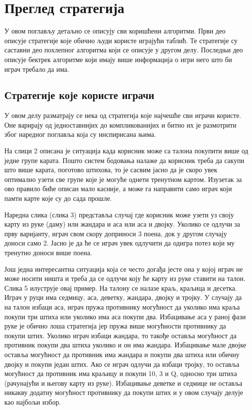 \documentclass[a4paper, 12pt, ngerman]{article}
\let\oldsection\section
\renewcommand\section{\clearpage\oldsection}
\let\oldsubsection\subsection
\renewcommand\subsection{\clearpage\oldsubsection}
\begin{document}
\section{Преглед стратегија}
У овом поглављу детаљно се описују сви коришћени алгоритми. Први део описује стратегије које обично људи користе играјући таблић. Те стратегије су саставни део похлепног алгоритма који се описује у другом делу. Последњи део описује бектрек алгоритме који имају више информација о игри него што би играч требало да има.


\subsection{Стратегије које користе играчи}
У овом делу разматрају се нека од стратегија које најчешће сви играчи користе. Оне варирају од једноставнијих до компликованијих и битно их је размотрити због наредног поглавља која су инспирисана њима.

На слици 2 описана је ситуација када корисник може са талона покупити више од једне групе карата. Пошто систем бодовања налаже да корисник треба да сакупи што више карата, поготово штихова, то је сасвим јасно да је скоро увек оптимално узети све групе које је могуће однети тренутном картом. Изузетак за ово правило биће описан мало касније, а може га направити само играч који памти карте које су до сада прошле.

Наредна слика (слика 3) представља случај где корисник може узети уз своју карту из руке (даму) или жандара и аса или аса и двојку. Уколико се одлучи за прву варијанту, играч свом скору доприноси 3 поена, док у другом случају доноси само 2. Јасно је да ће се играч увек одлучити да одигра потез који му тренутно доноси више поена.

Још једна интересантна ситуација која се често догађа јесте она у којој играч не може носити ништа и треба да се одлучи коју ће карту из руке ставити на талон. Слика 5 илуструје овај пример. На талону се налазе краљ, краљица и десетка. Играч у руци има седмицу, аса, деветку, жандара, двојку и тројку. У случају да на талон избаци аса, играч пружа противнику могућност да уколико има краља покупи три штиха или уколико има аса покупи два. Избацивање аса у раној фази руке је обично лоша стратегија јер пружа више могућности противнику да покупи штих. Уколико играч избаци жандара, то такође оставља могућност да противник покупи два штиха уколико и он има жандара. Избацивање мале двојке оставља могућност да противник има жандара и покупи два штиха или обичну двојку и покупи један штих. Ако се играч одлучи да избаци тројку, то оставља могућност да противник има краљицу и покупи 10, 3 и Q, односно три штиха (рачунајући и његову карту из руке). Избацивање деветке и седмице не оставља никакву додатну могућност противнику да покупи штих и у овом случају делује као најбољи избор.
\end{document}
